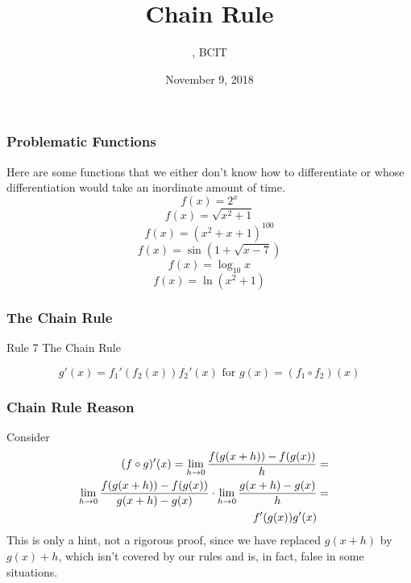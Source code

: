 \documentclass[xcolor=dvipsnames]{beamer}
\title{Chain Rule}
\subtitle{{\CourseNumber}, BCIT}
\author{\CourseName}
\date{November 9, 2018}
\begin{document}
\begin{frame}
  \titlepage
\end{frame}

\begin{frame}
  \frametitle{Problematic Functions}
Here are some functions that we either don't know how to differentiate
or whose differentiation would take an inordinate amount of time.
\begin{equation}
  \label{eq:faegeehi}
f(x)=2^{x}
\end{equation}
\begin{equation}
  \label{eq:kooteiju}
f(x)=\sqrt{x^{2}+1}
\end{equation}
\begin{equation}
  \label{eq:oochahph}
f(x)=(x^{2}+x+1)^{100}
\end{equation}
\begin{equation}
  \label{eq:bongaeza}
f(x)=\sin(1+\sqrt{x-7})
\end{equation}
\begin{equation}
  \label{eq:ooquonge}
f(x)=\log_{10}x
\end{equation}
\begin{equation}
  \label{eq:iejafaic}
f(x)=\ln(x^{2}+1)
\end{equation}
\end{frame}

\begin{frame}
  \frametitle{The Chain Rule}
  \begin{block}{Rule 7}
The Chain Rule
  \end{block}
\begin{equation}
  \label{eq:aepuaxai}
g'(x)=f_{1}'(f_{2}(x))f_{2}'(x)\mbox{ for }g(x)=(f_{1}\circ{}f_{2})(x)
\end{equation}
\end{frame}

\begin{frame}
  \frametitle{Chain Rule Reason}
Consider
\begin{align}
  \label{eq:prf}
  (f\circ{}g)'(x)=\lim_{h\rightarrow{}0}\frac{f(g(x+h))-f(g(x))}{h}&=&\notag \\
  \lim_{h\rightarrow{}0}\frac{f(g(x+h))-f(g(x))}{g(x+h)-g(x)}\cdot\lim_{h\rightarrow{}0}\frac{g(x+h)-g(x)}{h}&=& \\
  f'(g(x))g'(x)&&
\end{align}
This is only a hint, not a rigorous proof, since we have replaced
$g(x+h)$ by $g(x)+h$, which isn't covered by our rules and is, in
fact, false in some situations.
\end{frame}
\end{document}
